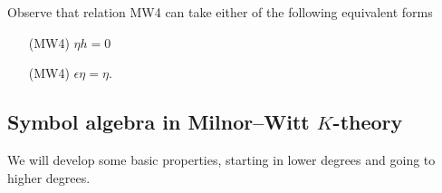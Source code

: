 \documentclass[11pt,openany]{book}
\begin{document}
\begin{remark} Observe that relation MW4 can take either of the following equivalent forms
\begin{enumerate}
    \item[(MW4)] $\eta h = 0$
    \item[(MW4)] $\epsilon \eta = \eta$.
\end{enumerate}
\end{remark}


\subsection{Symbol algebra in Milnor--Witt $K$-theory}

We will develop some basic properties, starting in lower degrees and going to higher degrees.
\end{document}

